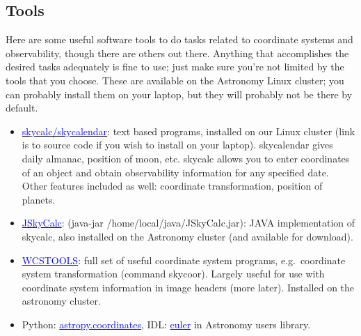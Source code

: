 \documentclass{article}
\begin{document}
\subsection*{Tools}
Here are some useful software tools to do tasks related to coordinate systems
and observability, though there are others out there. Anything that
accomplishes the desired tasks adequately is fine to use; just make sure
you're not limited by the tools that you choose. These are available
on the Astronomy Linux cluster; you can probably install them on your
laptop, but they will probably not be there by default.
\begin{itemize}
    \item \href{http://physics.dartmouth.edu/}
        {\textcolor{blue}{skycalc/skycalendar}}:
        text based programs, installed on our Linux cluster (link is
        to source code if you wish to install on your laptop).
        skycalendar gives daily almanac, position of moon, etc.
        skycalc allows you to enter coordinates of an object and
        obtain observability information for any specified date. Other
        features included as well: coordinate transformation, position
        of planets.
    \item \href{http://physics.dartmouth.edu/}
        {\textcolor{blue}{JSkyCalc}}:
        (java-jar /home/local/java/JSkyCalc.jar): JAVA implementation
        of skycalc, also installed on the Astronomy cluster (and
        available for download).
    \item \href{http://tdc-www.harvard.edu/wcstools/}
        {\textcolor{blue}{WCSTOOLS}}: full set of useful coordinate
        system programs, e.g.\ coordinate system transformation
        (command skycoor). Largely useful for use with coordinate
        system information in image
        headers (more later). Installed on the astronomy cluster.
    \item Python: \href{http://docs.astropy.org/en/stable/coordinates/}
        {\textcolor{blue}{astropy.coordinates}},
        IDL:
        \href{http://idlastro.gsfc.nasa.gov/ftp/pro/astro/euler.pro}
        {\textcolor{blue}{euler}} in Astronomy users library.
\end{itemize}
\end{document}
